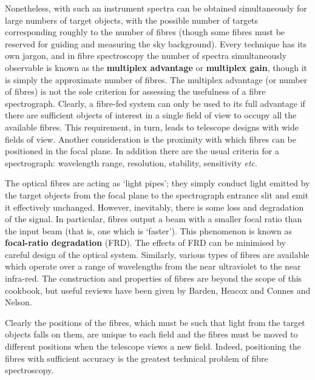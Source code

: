 \documentclass[twoside,11pt]{article}
\begin{document}
Nonetheless, with such an instrument spectra can be obtained
simultaneously for large numbers of target objects, with the possible number
of targets corresponding roughly to the number of fibres (though some
fibres must be reserved for guiding and measuring the sky background).
Every technique has its own jargon, and in fibre spectroscopy the number
of spectra simultaneously observable is known as the {\bf multiplex
advantage} or {\bf multiplex gain}, though it is simply the approximate
number of fibres.  The multiplex advantage (or number of fibres) is not
the sole criterion for assessing the usefulness of a fibre spectrograph.
Clearly, a fibre-fed system can only be used to its full advantage if
there are sufficient objects of interest in a single field of view to
occupy all the available fibres.  This requirement, in turn, leads to
telescope designs with wide fields of view.  Another consideration is
the proximity with which fibres can be positioned in the focal plane.
In addition there are the usual criteria for a spectrograph: wavelength
range, resolution, stability, sensitivity \emph{etc}.

The optical fibres are acting as `light pipes'; they simply conduct
light emitted by the target objects from the focal plane to the
spectrograph entrance slit and emit it effectively unchanged.  However,
inevitably, there is some loss and degradation of the signal.  In
particular, fibres output a beam with a smaller focal ratio than the
input beam (that is, one which is `faster').  This phenomenon is known
as {\bf focal-ratio degradation} (FRD).  The effects of FRD can be
minimised by careful design of the optical system.  Similarly, various
types of fibres are available which operate over a range of wavelengths
from the near ultraviolet to the near infra-red.  The construction and
properties of fibres are beyond the scope of this cookbook, but useful
reviews have been given by Barden\cite{BARDEN98}, Heacox and
Connes\cite{HEACOX92} and Nelson\cite{NELSON88}.

Clearly the positions of the fibres, which must be such that light
from the target objects falls on them, are unique to each field and
the fibres must be moved to different positions when the telescope
views a new field.  Indeed, positioning the fibres with sufficient
accuracy is the greatest technical problem of fibre spectroscopy.
\end{document}
